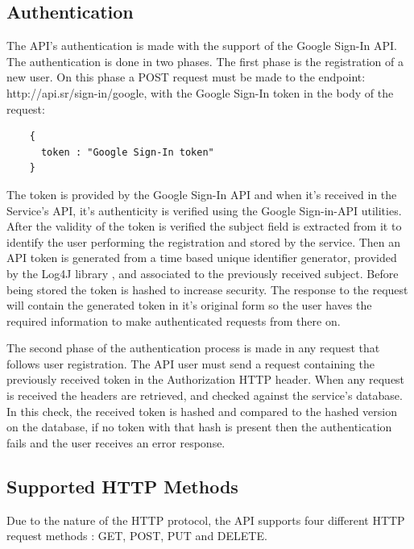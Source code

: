     \subsection*{Authentication}
    The API's authentication is made with the support of the Google Sign-In API. 
    The authentication is done in two phases. The first phase is the registration of a new user. 
    On this phase a POST \cite{httppostdocs} request must be made to the endpoint: http://api.sr/sign-in/google, 
    with the Google Sign-In token in the body of the request:
    \begin{lstlisting}
    {
      token : "Google Sign-In token"
    }
     \end{lstlisting}
    The token is provided by the Google Sign-In API and when it's received in the Service's API, 
    it's authenticity is verified using the Google Sign-in-API utilities. After the validity of the token is verified 
    the subject field is extracted from it to identify the user performing the registration and stored by the service. 
    Then an API token is generated from a time based unique identifier generator, provided by the Log4J library \cite{log4j},
    and associated to the previously received subject. Before being stored the token is hashed to increase security. 
    The response to the request will contain the generated token in it's original form so the user haves the required information 
    to make authenticated requests from there on.\par

    The second phase of the authentication process is made in any request that follows user registration. The API user must 
    send a request containing the previously received token in the Authorization HTTP header. When any request is received 
    the headers are retrieved, and checked against the service's database. In this check, the received token is hashed and 
    compared to the hashed version on the database, if no token with that hash is present then the authentication fails 
    and the user receives an error response.

    \subsection*{Supported HTTP Methods}
        Due to the nature of the HTTP protocol, the API supports four different HTTP request methods \cite{apihttpverbsdocs}: GET, POST, PUT and DELETE.
        
